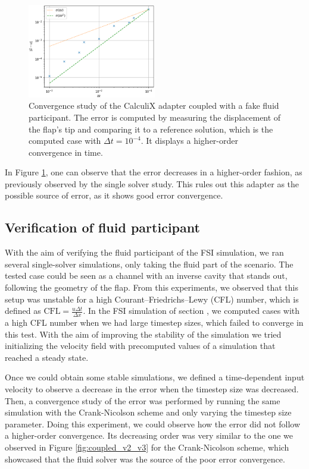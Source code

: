 \documentclass[
  english,        %
  font=times,     %
  onecolumn,      %
]{tumarticle}
\begin{document}
\begin{figure}[!ht]
    \centering
    \includegraphics[width=0.5\textwidth]{resources/fake_fluid.png}
    \caption{Convergence study of the CalculiX adapter coupled with a fake fluid participant. The error is computed by measuring the displacement of the flap's tip and comparing it to a reference solution, which is the computed case with $\Delta t = 10^{-4}$. It displays a higher-order convergence in time.}
    \label{fig:fake-fluid}
\end{figure}

In Figure \ref{fig:fake-fluid}, one can observe that the error decreases in a higher-order fashion, as previously observed by the single solver study. This rules out this adapter as the possible source of error, as it shows good error convergence.

\subsection{Verification of fluid participant} \label{sec:fluid-part}
With the aim of verifying the fluid participant of the FSI simulation, we ran several single-solver simulations, only taking the fluid part of the scenario. The tested case could be seen as a channel with an inverse cavity that stands out, following the geometry of the flap. From this experiments, we observed that this setup was unstable for a high Courant–Friedrichs–Lewy (CFL) number, which is defined as $\text{CFL} = \frac{u \Delta t}{\Delta x}$. In the FSI simulation of section \label{sec:FSI}, we computed cases with a high CFL number when we had large timestep sizes, which failed to converge in this test. With the aim of improving the stability of the simulation we tried initializing the velocity field with precomputed values of a simulation that reached a steady state.

Once we could obtain some stable simulations, we defined a time-dependent input velocity to observe a decrease in the error when the timestep size was decreased. Then, a convergence study of the error was performed by running the same simulation with the Crank-Nicolson scheme and only varying the timestep size parameter. Doing this experiment, we could observe how the error did not follow a higher-order convergence. Its decreasing order was very similar to the one we observed in Figure \ref{fig:coupled_v2_v3} for the Crank-Nicolson scheme, which showcased that the fluid solver was the source of the poor error convergence.
\end{document}
